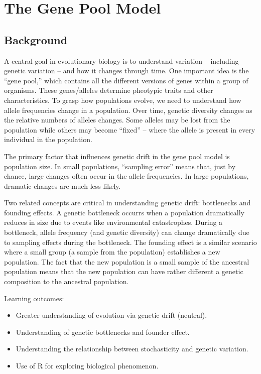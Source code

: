 \documentclass[
  a4paper]{book}
\providecommand{\tightlist}{%
  \setlength{\itemsep}{0pt}\setlength{\parskip}{0pt}}
\begin{document}
\hypertarget{the-gene-pool-model}{%
\chapter{The Gene Pool Model}\label{the-gene-pool-model}}

\hypertarget{background-10}{%
\section{Background}\label{background-10}}

A central goal in evolutionary biology is to understand variation -- including genetic variation -- and how it changes through time. One important idea is the ``gene pool,'' which contains all the different versions of genes within a group of organisms. These genes/alleles determine pheotypic traits and other characteristics. To grasp how populations evolve, we need to understand how allele frequencies change in a population. Over time, genetic diversity changes as the relative numbers of alleles changes. Some alleles may be lost from the population while others may become ``fixed'' -- where the allele is present in every individual in the population.

The primary factor that influences genetic drift in the gene pool model is population size. In small populations, ``sampling error'' means that, just by chance, large changes often occur in the allele frequencies. In large populations, dramatic changes are much less likely.

Two related concepts are critical in understanding genetic drift: bottlenecks and founding effects. A genetic bottleneck occurrs when a population dramatically reduces in size due to events like environmental catastrophes. During a bottleneck, allele frequency (and genetic diversity) can change dramatically due to sampling effects during the bottleneck. The founding effect is a similar scenario where a small group (a sample from the population) establishes a new population. The fact that the new population is a small sample of the ancestral population means that the new population can have rather different a genetic composition to the ancestral population.

\begin{do-something}
Learning outcomes:

\begin{itemize}
\tightlist
\item
  Greater understanding of evolution via genetic drift (neutral).
\item
  Understanding of genetic bottlenecks and founder effect.
\item
  Understanding the relationship between stochasticity and genetic
  variation.
\item
  Use of R for exploring biological phenomenon.
\end{itemize}
\end{do-something}
\end{document}

